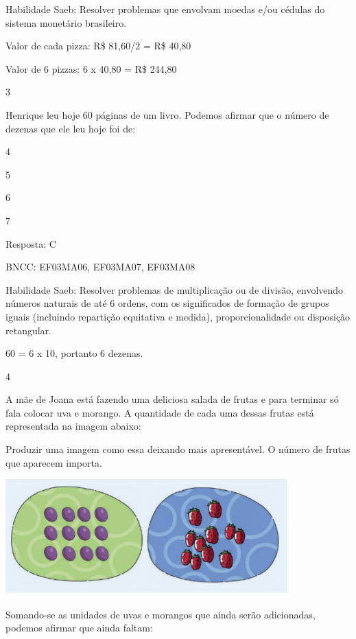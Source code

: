 \begin{escolha}
{\begin{escolha}
{Habilidade Saeb: Resolver problemas que envolvam moedas e/ou cédulas do
sistema monetário brasileiro.

Valor de cada pizza: R\$ 81,60/2 = R\$ 40,80

Valor de 6 pizzas: 6 x 40,80 = R\$ 244,80

\num{3}

Henrique leu hoje 60 páginas de um livro. Podemos afirmar que o número
de dezenas que ele leu hoje foi de:

\begin{escolha}

\item
  4
\item
  5
\item
  6
\item
  7
\end{escolha}

Resposta: C

BNCC: EF03MA06, EF03MA07, EF03MA08

Habilidade Saeb: Resolver problemas de multiplicação ou de divisão,
envolvendo números naturais de até 6 ordens, com os significados de
formação de grupos iguais (incluindo repartição equitativa e medida),
proporcionalidade ou disposição retangular.

60 = 6 x 10, portanto 6 dezenas.

\num{4}

A mãe de Joana está fazendo uma deliciosa salada de frutas e para
terminar só fala colocar uva e morango. A quantidade de cada uma dessas
frutas está representada na imagem abaixo:

Produzir uma imagem como essa deixando mais apresentável. O número de
frutas que aparecem importa.

\includegraphics[width=4.26704in,height=1.75849in]{media/image132.png}

Somando-se as unidades de uvas e morangos que ainda serão adicionadas,
podemos afirmar que ainda faltam:

\begin{escolha}


\end{escolha}}
\end{escolha}}
\end{escolha}
